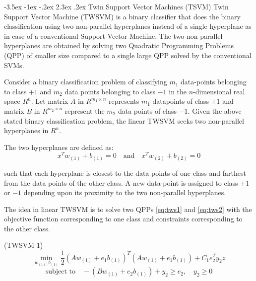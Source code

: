 \documentclass[12pt,a4paper,oneside,english]{report}
\makeatletter
\renewcommand\section{\@startsection {section}{1}{\z@}%
                                   {-3.5ex \@plus -1ex \@minus -.2ex}%
                                   {2.3ex \@plus.2ex}%
                                   {\centering\normalfont\LARGE\bfseries}}
\makeatother
\begin{document}
\section{Twin Support Vector Machines (TSVM)}
Twin Support Vector Machine (TWSVM)\cite{tsvm} is a binary classifier that does the binary classification using two non-parallel hyperplanes instead of a single hyperplane as in case of a conventional Support Vector Machine. The two non-parallel hyperplanes are obtained by solving two Quadratic Programming Problems (QPP) of smaller size compared to a single large QPP solved by the conventional SVMs. 

Consider a binary classification problem of classifying \( m_1 \) data-points belonging to class \( +1 \) and \( m_2 \) data points belonging to class \( -1 \) in the \( n \)-dimensional real space \( R^n \). Let matrix \( A \) in \( R^{m_1 \times n} \) represents \( m_1 \) datapoints of class \( +1 \) and matrix \( B \) in \( R^{m_2 \times n} \) represent the \( m_2 \) data points of class \( -1 \). Given the above stated binary classification problem, the linear TWSVM seeks two non-parallel hyperplanes in \( R^n \).


The two hyperplanes are defined as:
\begin{equation}
    x^T w_{(1)} + b_{(1)} = 0 \quad \text{and} \quad x^T w_{(2)} + b_{(2)} = 0 
\end{equation}

such that each hyperplane is closest to the data points of one class and farthest from the data points of the other class. A new data-point is assigned to class \( +1 \) or \( -1 \) depending upon its proximity to the two non-parallel hyperplanes.

\noindent
The idea in linear TWSVM \cite{tsvm} is to solve two QPPs \eqref{eq:tws1} and \eqref{eq:tws2} with the objective function corresponding to one class and constraints corresponding to the other class.

(TWSVM 1)
\begin{equation} \label{eq:tws1}
    \min_{w_{(1)}, b_{(1)}} \frac{1}{2} (Aw_{(1)} + e_1 b_{(1)})^T (Aw_{(1)} + e_1 b_{(1)}) + C_1 e_2^T y_2z
\end{equation}
\[
\text{subject to} \quad -(Bw_{(1)} + e_2 b_{(1)}) + y_2 \geq e_2, \quad y_2 \geq 0
\]
\end{document}
